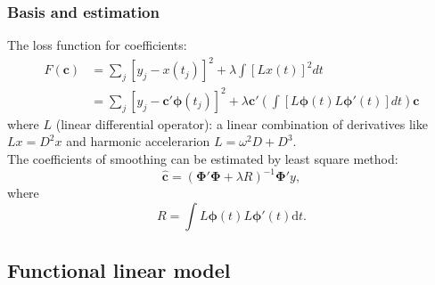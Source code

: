 \documentclass[
	9pt, %
]{beamer}
\begin{document}
\begin{frame}
	\frametitle{Basis and estimation}
	The loss function for coefficients: 
\begin{align*}
	F(\bm c) &= \sum_j [y_j -x(t_j) ]^2 + \lambda\int [Lx(t)]^2 dt\\
               &= \sum_j [y_j - \bm{c}'\bm{\phi}(t_j)]^2 + \lambda \bm c'(\int [L\bm{\phi}(t) L\bm{\phi}'(t)] dt)  \bm c
\end{align*}
	where $L$ (linear differential operator): a linear combination of derivatives like $Lx = D^2 x$ and harmonic accelerarion $L = \omega^2 D + D^3$.\\	
	\bigskip
	The coefficients of smoothing can be estimated by least square method:  
	\[\hat{\bm c} = (\bm{\Phi}'\bm{\Phi} +\lambda R)^{-1}\bm{\Phi}'y,\]
	where $$R = \int L\bm{\phi}(t)L\bm{\phi}'(t)\mathrm{d}t.$$
	\end{frame}



\subsection{Functional linear model}
\end{document}
